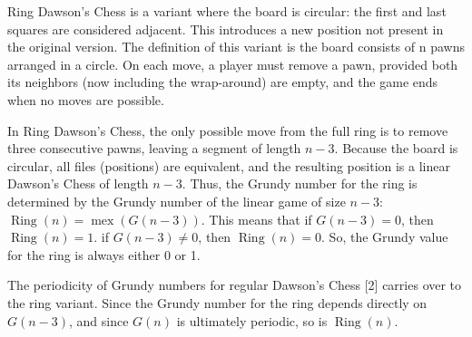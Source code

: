 \indent Ring Dawson's Chess is a variant where the board is circular: the first and last squares are considered adjacent. This introduces a new position not present in the original version. The definition of this variant is the board consists of n pawns arranged in a circle. On each move, a player must remove a pawn, provided both its neighbors (now including the wrap-around) are empty, and the game ends when no moves are possible. 
\vspace{0.5em}

\indent In Ring Dawson's Chess, the only possible move from the full ring is to remove three consecutive pawns, leaving a segment of length $n-3$. Because the board is circular, all files (positions) are equivalent, and the resulting position is a linear Dawson's Chess of length $n-3$. Thus, the Grundy number for the ring is determined by the Grundy number of the linear game of size $n-3$: $\operatorname{Ring}(n) = \operatorname{mex}\left( G(n-3) \right)$. This means that if $G(n-3) = 0$, then $\operatorname{Ring}(n)=1$. if $G(n-3) \neq 0$, then $\operatorname{Ring}(n)=0$. So, the Grundy value for the ring is always either 0 or 1. 
\vspace{0.5em}

\indent The periodicity of Grundy numbers for regular Dawson's Chess [2] carries over to the ring variant. Since the Grundy number for the ring depends directly on $G(n-3)$, and since $G(n)$ is ultimately periodic, so is $\operatorname{Ring}(n)$.
